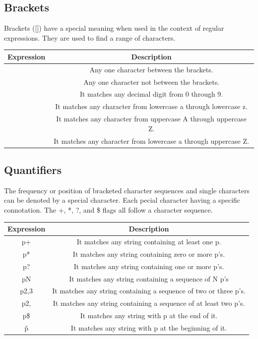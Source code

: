 \documentclass[11pt,a4paper]{article}
\begin{document}
\subsection*{Brackets}

Brackets ([]) have a special meaning when used in the context of regular expressions. They are used to find a range of characters.

\begin{table}[ht]
\begin{center}
\begin{tabular}{| c | c |}\hline
\textbf{Expression} & \textbf{Description}\\ \hline
[...] &  Any one character between the brackets.\\ \hline
[\^...] & Any one character not between the brackets.\\ \hline
[0-9] &  It matches any decimal digit from 0 through 9.\\ \hline
[a-z] & It matches any character from lowercase a through lowercase z.\\ \hline
[A-Z] & It matches any character from uppercase A through uppercase Z.\\ \hline
[a-Z] & It matches any character from lowercase a through uppercase Z.\\ \hline
\end{tabular}
\end{center}
\end{table}

\subsection*{Quantifiers}

The frequency or position of bracketed character sequences and single characters can be denoted by a special character. Each pecial character having a specific connotation. The +, *, ?, and \$ flags all follow a character sequence.


\begin{table}[ht]
\begin{center}
\begin{tabular}{| c | c |}\hline
\textbf{Expression} & \textbf{Description}\\ \hline
p+ & It matches any string containing at least one p.\\ \hline
p* & It matches any string containing zero or more p's.\\ \hline
p? &  It matches any string containing one or more p's.\\ \hline
p{N} &  It matches any string containing a sequence of N p's\\ \hline
p{2,3} & It matches any string containing a sequence of two or three p's.\\ \hline
p{2, } & It matches any string containing a sequence of at least two p's.\\ \hline
p\$ & It matches any string with p at the end of it.\\ \hline
\^p &  It matches any string with p at the beginning of it.\\ \hline
\end{tabular}
\end{center}
\end{table}
\end{document}
